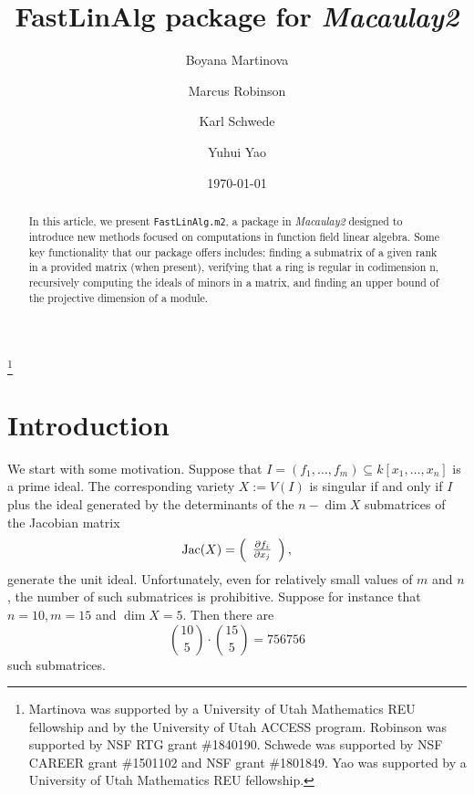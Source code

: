 \documentclass[11pt]{amsart}
\begin{document}
\title{{FastLinAlg} package for \emph{Macaulay2}}
\author{Boyana Martinova}
\author{Marcus Robinson}
\author{Karl Schwede}
\author{Yuhui Yao}
\address{Department of Mathematics, University of Utah, 155 S 1400 E Room 233, Salt Lake City, UT, 84112}
\date{\today}

\begin{abstract}
In this article, we present {\tt FastLinAlg.m2}, a package in \emph{Macaulay2} designed to
 introduce new methods focused on computations in function field linear algebra. 
Some key functionality that our 
package offers includes: finding a submatrix of a given rank in a provided matrix (when present), 
verifying that a ring is regular in codimension n, recursively computing the ideals of minors in a 
matrix, and finding an upper bound of the projective dimension of a module.
\end{abstract}

 
\thanks{Martinova was supported by a University of Utah Mathematics REU fellowship and by the University of Utah ACCESS program.  
Robinson was supported by NSF RTG grant \#1840190.
Schwede was supported by NSF CAREER grant \#1501102 and NSF grant \#1801849.  
Yao was supported by a University of Utah Mathematics REU fellowship.}

\maketitle

\section{Introduction}

We start with some motivation.  
Suppose that $I = (f_1, \dots, f_m) \subseteq k[x_1, \dots, x_n]$ is a prime ideal.  The corresponding variety $X := V(I)$ is singular if and only if $I$ plus the ideal generated by the determinants of the $n-\dim X$ submatrices of the Jacobian matrix 
\[
\mathrm{Jac}(X) = \left( \begin{array}{c} {\partial f_i \over \partial x_j}\end{array}\right),
\]
generate the unit ideal.  
Unfortunately, even for relatively small values of $m$ and $n$, the number of such submatrices is prohibitive.  Suppose for instance that $n = 10, m = 15$ and $\dim X = 5$.  Then there are  
\[
  {10 \choose 5} \cdot {15 \choose 5} =  756756
\]
such submatrices.
\end{document}
